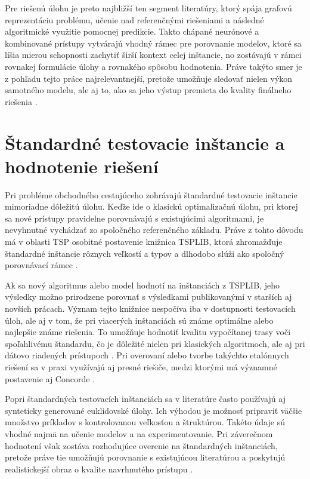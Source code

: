 Pre riešenú úlohu je preto najbližší ten segment literatúry, ktorý spája
grafovú reprezentáciu problému, učenie nad referenčnými riešeniami a následné
algoritmické využitie pomocnej predikcie. Takto chápané neurónové a kombinované
prístupy vytvárajú vhodný rámec pre porovnanie modelov, ktoré sa líšia mierou
schopnosti zachytiť širší kontext celej inštancie, no zostávajú v rámci
rovnakej formulácie úlohy a rovnakého spôsobu hodnotenia. Práve takýto smer je
z pohľadu tejto práce najrelevantnejší, pretože umožňuje sledovať nielen výkon
samotného modelu, ale aj to, ako sa jeho výstup premieta do kvality finálneho
riešenia
\parencite{joshi2019gcn,joshi2022generalization,hudson2022gls,xin2021neurolkh}.

\section{Štandardné testovacie inštancie a hodnotenie riešení}

Pri probléme obchodného cestujúceho zohrávajú štandardné testovacie inštancie
mimoriadne dôležitú úlohu. Keďže ide o klasickú optimalizačnú úlohu, pri ktorej
sa nové prístupy pravidelne porovnávajú s existujúcimi algoritmami, je
nevyhnutné vychádzať zo spoločného referenčného základu. Práve z tohto dôvodu
má v oblasti TSP osobitné postavenie knižnica TSPLIB, ktorá zhromažďuje
štandardné inštancie rôznych veľkostí a typov a dlhodobo slúži ako spoločný
porovnávací rámec \parencite{reinelt1991tsplib,joshi2022generalization}.

Ak sa nový algoritmus alebo model hodnotí na inštanciách z TSPLIB, jeho
výsledky možno prirodzene porovnať s výsledkami publikovanými v starších aj
novších prácach. Význam tejto knižnice nespočíva iba v dostupnosti testovacích
úloh, ale aj v tom, že pri viacerých inštanciách sú známe optimálne alebo
najlepšie známe riešenia. To umožňuje hodnotiť kvalitu vypočítanej trasy voči
spoľahlivému štandardu, čo je dôležité nielen pri klasických algoritmoch, ale
aj pri dátovo riadených prístupoch \parencite{reinelt1991tsplib}. Pri overovaní
alebo tvorbe takýchto etalónnych riešení sa v praxi využívajú aj presné
riešiče, medzi ktorými má významné postavenie aj Concorde
\parencite{concorde2003solver}.

Popri štandardných testovacích inštanciách sa v literatúre často používajú aj
synteticky generované euklidovské úlohy. Ich výhodou je možnosť pripraviť
väčšie množstvo príkladov s kontrolovanou veľkosťou a štruktúrou. Takéto údaje
sú vhodné najmä na učenie modelov a na experimentovanie. Pri záverečnom
hodnotení však zostáva rozhodujúce overenie na štandardných inštanciách, pretože
práve tie umožňujú porovnanie s existujúcou literatúrou a poskytujú
realistickejší obraz o kvalite navrhnutého prístupu
\parencite{joshi2022generalization,bengio2021mlco,reinelt1991tsplib}.

